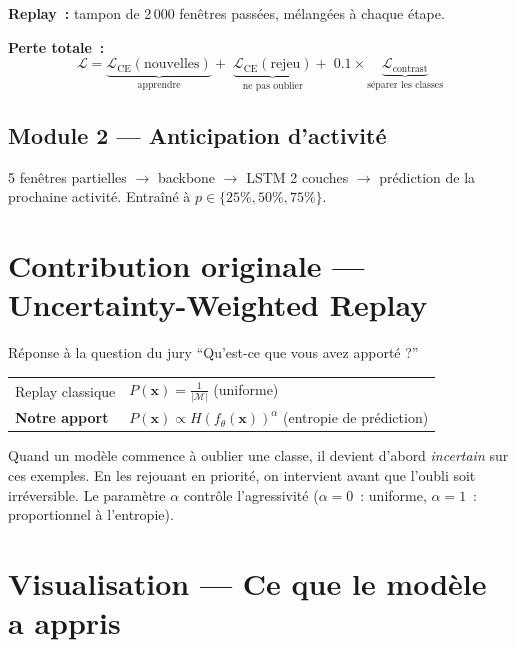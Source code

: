 \documentclass[12pt, a4paper]{article}
\begin{document}
\textbf{Replay~:} tampon de 2\,000 fenêtres passées, mélangées à chaque étape.

\textbf{Perte totale~:}
\[
\mathcal{L} =
\underbrace{\mathcal{L}_{\text{CE}}(\text{nouvelles})}_{\text{apprendre}}
+\;
\underbrace{\mathcal{L}_{\text{CE}}(\text{rejeu})}_{\text{ne pas oublier}}
+\;0.1\times
\underbrace{\mathcal{L}_{\text{contrast}}}_{\text{séparer les classes}}
\]

\subsection{Module 2 --- Anticipation d'activité}

5 fenêtres partielles $\to$ backbone $\to$ LSTM 2 couches $\to$
prédiction de la prochaine activité. Entraîné à $p \in \{25\%, 50\%, 75\%\}$.

\section{Contribution originale --- Uncertainty-Weighted Replay}

\begin{boiteorange}{Réponse à la question du jury}
``Qu'est-ce que vous avez apporté ?''
\end{boiteorange}

\begin{center}
\begin{tabular}{ll}
Replay classique  & $P(\mathbf{x}) = \frac{1}{|\mathcal{M}|}$ (uniforme) \\[6pt]
\textbf{Notre apport} & $P(\mathbf{x}) \propto H(f_\theta(\mathbf{x}))^\alpha$
  (entropie de prédiction)
\end{tabular}
\end{center}

Quand un modèle commence à oublier une classe, il devient d'abord
\emph{incertain} sur ces exemples. En les rejouant en priorité,
on intervient avant que l'oubli soit irréversible.
Le paramètre $\alpha$ contrôle l'agressivité ($\alpha=0$~: uniforme,
$\alpha=1$~: proportionnel à l'entropie).

\section{Visualisation --- Ce que le modèle a appris}
\end{document}
